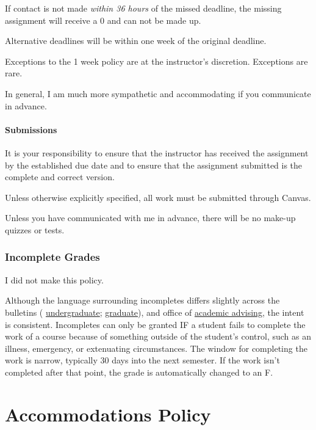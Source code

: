If contact is not made \emph{within 36 hours} of the missed deadline, the missing assignment will receive a 0 and can not be made up.

Alternative deadlines will be within one week of the original deadline.

Exceptions to the 1 week policy are at the instructor's discretion. Exceptions are rare.

In general, I am much more sympathetic and accommodating if you communicate in advance.

\hypertarget{submissions}{%
\subsubsection{Submissions}\label{submissions}}

It is your responsibility to ensure that the instructor has received the assignment by the established due date and to ensure that the assignment submitted is the complete and correct version.

Unless otherwise explicitly specified, all work must be submitted through Canvas.

Unless you have communicated with me in advance, there will be no make-up quizzes or tests.

\hypertarget{incomplete-grades}{%
\subsection{Incomplete Grades}\label{incomplete-grades}}

I did not make this policy.

Although the language surrounding incompletes differs slightly across the bulletins ( \href{https://bulletin.wfu.edu/undergraduate/procedures/exams-grading/\#:~:text=Incomplete\%20Grade}{undergraduate}; \href{https://bulletin.wfu.edu/graduate/procedures/grading/\#:~:text=Grade\%20of\%20I}{graduate}), and office of \href{https://advising.wfu.edu/academic-challenges/incompletes/}{academic advising}, the intent is consistent.
Incompletes can only be granted IF a student fails to complete the work of a course because of something outside of the student's control, such as an illness, emergency, or extenuating circumstances. The window for completing the work is narrow, typically 30 days into the next semester. If the work isn't completed after that point, the grade is automatically changed to an F.

\hypertarget{accommodations-policy}{%
\chapter{Accommodations Policy}\label{accommodations-policy}}

